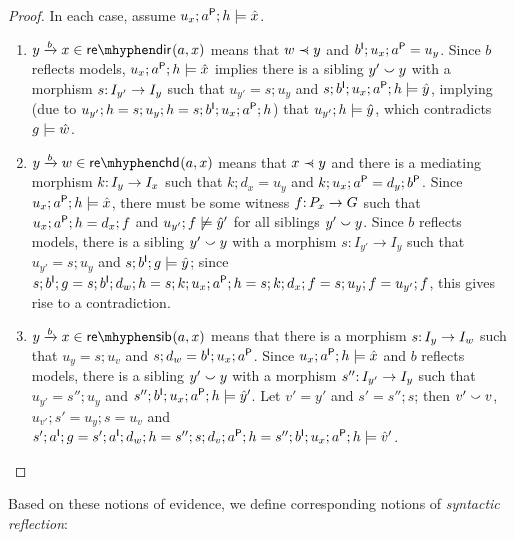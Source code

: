 \begin{proof}
In each case, assume $u_x;a\P;h\sat \hat x$.
\begin{enumerate}
\item $\trip ybx\in \redir{a,x}$ means that $w\parentof y$ and $b\I;u_x;a\P=u_y$. Since $b$ reflects models, $u_x;a\P;h\sat \hat x$ implies there is a sibling $y'\sibling y$ with a morphism $s\of I_{y'}\to I_y$ such that $u_{y'}=s;u_y$ and $s;b\I;u_x;a\P;h\sat \hat y$, implying (due to $u_{y'};h=s;u_y;h=s;b\I;u_x;a\P;h$) that $u_{y'};h\sat \hat y$, which contradicts $g\sat \hat w$.

\item $\trip ybw\in \rechd{a,x}$ means that $x\parentof y$ and there is a mediating morphism $k\of I_y\to I_x$ such that $k;d_x=u_y$ and $k;u_x;a\P=d_y;b\P$. Since $u_x;a\P;h\sat \hat x$, there must be some witness $f\of P_x\to G$ such that $u_x;a\P;h=d_x;f$ and $u_{y'};f\nsat \hat y'$ for all siblings $y'\sibling y$. Since $b$ reflects models, there is a sibling $y'\sibling y$ with a morphism $s:I_{y'}\to I_y$ such that $u_{y'}=s;u_y$ and $s;b\I;g\sat \hat y$; since $s;b\I;g= s;b\I;d_w;h= s;k;u_x;a\P;h=s;k;d_x;f=s;u_y;f=u_{y'};f$, this gives rise to a contradiction.

\item $\trip ybx\in \resib{a,x}$ means that there is a morphism $s\of I_y\to I_w$ such that $u_y=s;u_v$ and $s;d_w=b\I;u_x;a\P$. Since $u_x;a\P;h\sat \hat x$ and $b$ reflects models, there is a sibling $y'\sibling y$ with a morphism $s''\of I_{y'}\to I_y$ such that $u_{y'}=s'';u_y$ and $s'';b\I;u_x;a\P;h\sat \hat y'$. Let $v'=y'$ and $s'=s'';s$; then $v'\sibling v$, $u_{v'};s'=u_y;s=u_v$ and $s';a\I;g= s';a\I;d_w;h= s'';s;d_v;a\P;h= s'';b\I;u_x;a\P;h \sat \hat v'$.
\end{enumerate}
\end{proof}
%
Based on these notions of evidence, we define corresponding notions of \emph{syntactic reflection}:

